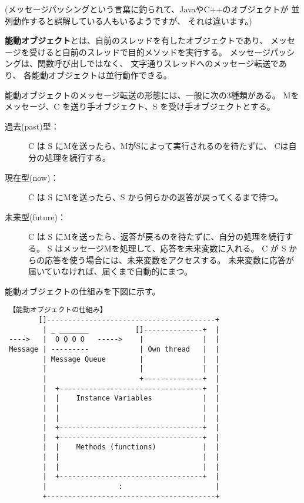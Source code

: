 \documentclass{jarticle}
\begin{document}
(メッセージパッシングという言葉に釣られて、JavaやC++のオブジェクトが
並列動作すると誤解している人もいるようですが、
それは違います。)

{\bf 能動オブジェクト}とは、自前のスレッドを有したオブジェクトであり、
メッセージを受けると自前のスレッドで目的メソッドを実行する。
メッセージパッシングは、関数呼び出しではなく、
文字通りスレッドへのメッセージ転送であり、
各能動オブジェクトは並行動作できる。

能動オブジェクトのメッセージ転送の形態には、一般に次の3種類がある。
Mをメッセージ、C を送り手オブジェクト、S を受け手オブジェクトとする。
\begin{description}
\item[過去(past)型：]
  C は S にMを送ったら、MがSによって実行されるのを待たずに、
  Cは自分の処理を続行する。

\item[現在型(now)：]
  C は S にMを送ったら、S から何らかの返答が戻ってくるまで待つ。

\item[未来型(future)：]
  C は S にMを送ったら、返答が戻るのを待たずに、自分の処理を続行する。
  S はメッセージMを処理して、応答を未来変数に入れる。
  C が S からの応答を使う場合には、未来変数をアクセスする。
  未来変数に応答が届いていなければ、届くまで自動的にまつ。
\end{description}


能動オブジェクトの仕組みを下図に示す。


{\small\begin{verbatim}
 【能動オブジェクトの仕組み】
        []----------------------------------------+
         | _ _______           []--------------+  |
 ---->   |  O O O O   ----->    |              |  |
 Message | ---------            | Own thread   |  |
         | Message Queue        |              |  |
         |                      |              |  |
         |                      +--------------+  |
         |  +----------------------------------+  |
         |  |    Instance Variables            |  |
         |  |                                  |  |
         |  |                                  |  |
         |  +----------------------------------+  |
         |  +----------------------------------+  |
         |  |    Methods (functions)           |  |
         |  |                                  |  |
         |  |                                  |  |
         |  +----------------------------------+  |
         |                 :                      |
         +----------------------------------------+
\end{verbatim}}
\end{document}
